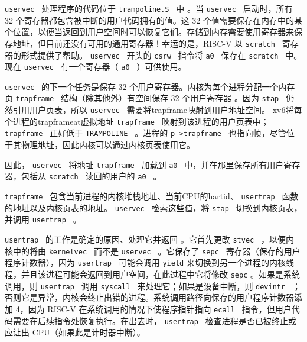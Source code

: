  {    \tt    uservec   }  处理程序的代码位于  {    \tt trampoline.S   }  中
     。当  {    \tt    uservec   }  启动时，所有 32 个寄存器都包含被中断的用户代码拥有的值。这 32 个值需要保存在内存中的某个位置，以便当返回到用户空间时可以恢复它们。存储到内存需要使用寄存器来保存地址，但目前还没有可用的通用寄存器！幸运的是，RISC-V 以  {    \tt    scratch   }  寄存器的形式提供了帮助。  {    \tt    uservec   }  开头的  {    \tt    csrw   }  指令将  {    \tt    a0   }  保存在  {    \tt    scratch   }  中。现在
  {    \tt    uservec   }  有一个寄存器（  {    \tt    a0   }  ）可供使用。  

 {    \tt    uservec   }  的下一个任务是保存 32 个用户寄存器。内核为每个进程分配一个内存页
  {    \tt    trapframe   }  结构（除其他外）有空间保存 32 个用户寄存器
        。因为 {    \tt    stap   } 仍然引用用户页表，所以 {    \tt    uservec   } 需要将trapframe映射到用户地址空间。 xv6将每个进程的trapframeat虚拟地址 {    \tt    trapframe   } 映射到该进程的用户页表中；
  {    \tt    trapframe   }  正好低于  {    \tt    TRAMPOLINE   }  。进程的  {    \tt    p->trapframe   }  也指向帧，尽管位于其物理地址，因此内核可以通过内核页表使用它。  

因此， {    \tt    uservec   }  将地址  {    \tt    trapframe   }  加载到  {    \tt    a0   }  中，并在那里保存所有用户寄存器，包括从  {    \tt    scratch   }  读回的用户的  {    \tt    a0   }  。  

 {    \tt    trapframe   } 包含当前进程的内核堆栈地址、当前CPU的hartid、 {    \tt    usertrap   } 函数的地址以及内核页表的地址。  {    \tt    uservec   }  检索这些值，将  {    \tt    stap   }  切换到内核页表，并调用  {    \tt    usertrap   }  。  

 {    \tt    usertrap   } 的工作是确定的原因、处理它并返回
    。它首先更改  {    \tt    stvec   } ，以便内核中的将由
  {    \tt    kernelvec   }  而不是  {    \tt    uservec   }  。它保存了 {    \tt    sepc   } 寄存器（保存的用户程序计数器），因为
  {    \tt    usertrap   }  可能会调用    \lstinline{yield}    来切换到另一个进程的内核线程，并且该进程可能会返回到用户空间，在此过程中它将修改    \lstinline{sepc}    。如果是系统调用，则  {    \tt    usertrap   }  调用  {    \tt    syscall   }  来处理它；如果是设备中断，则  {    \tt    devintr   }  ；否则它是异常，内核会终止出错的进程。系统调用路径向保存的用户程序计数器添加 4，因为 RISC-V 在系统调用的情况下使程序指针指向  {    \tt    ecall   }  指令，但用户代码需要在后续指令处恢复执行。在出去时， {    \tt    usertrap   }  检查进程是否已被终止或应让出 CPU（如果此是计时器中断）。  

